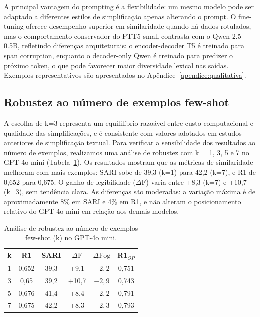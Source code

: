\documentclass[a4paper, twocolumn, 11pt, twoside]{article}
\begin{document}
A principal vantagem do prompting é a flexibilidade: um mesmo modelo
pode ser adaptado a diferentes estilos de simplificação apenas
alterando o prompt. O fine-tuning oferece desempenho superior em
similaridade quando há dados rotulados, mas o comportamento
conservador do PTT5-small contrasta com o Qwen 2.5 0.5B, refletindo
diferenças arquiteturais: o encoder-decoder T5 é treinado para
span corruption, enquanto o decoder-only Qwen é treinado para predizer
o próximo token, o que pode favorecer maior diversidade lexical nas
saídas. Exemplos representativos são apresentados no
Apêndice~\ref{apendice:qualitativa}.

\subsection{Robustez ao número de exemplos few-shot}

A escolha de k=3 representa um equililíbrio razoável entre
custo computacional e qualidade das simplificações, e é
consistente com valores adotados em estudos anteriores de
simplificação textual. Para verificar a sensibilidade dos
resultados ao número de exemplos, realizamos uma análise de
robustez com k = 1, 3, 5 e 7 no GPT-4o mini
(Tabela~\ref{tab:ablation}).
Os resultados mostram que as métricas de similaridade melhoram
com mais exemplos: SARI sobe de 39,3 (k=1) para 42,2 (k=7),
e R1 de 0,652 para 0,675.
O ganho de legibilidade ($\Delta \mathrm{F}$) varia entre +8,3 (k=7) e +10,7 (k=3),
sem tendência clara.
As diferenças são moderadas: a variação máxima é de
aproximadamente 8\% em SARI e 4\% em R1, e não alteram o
posicionamento relativo do GPT-4o mini em relação aos demais
modelos.

\begin{table}[htbp]
\centering
\caption{Análise de robustez ao número de exemplos few-shot (k)
no GPT-4o mini.}
\label{tab:ablation}
\footnotesize
\begin{tabular}{c c c c c c}
\toprule
k & R1 & SARI & $\Delta \mathrm{F}$ & $\Delta \mathrm{Fog}$ & R1$_{OP}$ \\
\midrule
1 & 0,652 & 39,3 & +9,1 & $-2,2$ & 0,751 \\
3 & 0,65 & 39,2 & +10,7 & $-2,9$ & 0,743 \\
5 & 0,676 & 41,4 & +8,4 & $-2,2$ & 0,791 \\
7 & 0,675 & 42,2 & +8,3 & $-2,3$ & 0,793 \\
\bottomrule
\end{tabular}
\end{table}
\end{document}
